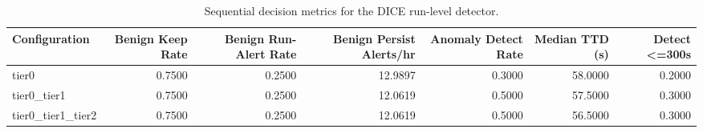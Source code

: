 \begin{table}[t]
\centering
\caption{Sequential decision metrics for the DICE run-level detector.}
\label{tab:dice_sequential_metrics}
\footnotesize
\begin{tabular}{lrrrrrr}
\toprule
Configuration & Benign Keep Rate & Benign Run-Alert Rate & Benign Persist Alerts/hr & Anomaly Detect Rate & Median TTD (s) & Detect <=300s \\
\midrule
tier0 & 0.7500 & 0.2500 & 12.9897 & 0.3000 & 58.0000 & 0.2000 \\
tier0_tier1 & 0.7500 & 0.2500 & 12.0619 & 0.5000 & 57.5000 & 0.3000 \\
tier0_tier1_tier2 & 0.7500 & 0.2500 & 12.0619 & 0.5000 & 56.5000 & 0.3000 \\
\bottomrule
\end{tabular}

\end{table}
